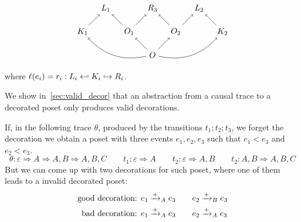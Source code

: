 \begin{definition}
\begin{description}
       \[
    \begin{tikzpicture} %
      \node (o) at (0,-1) {\(O\)};
      \node (r3) at (0,1) {\(R_3\)};
      \node (o1) at (-1,0) {\(O_1\)};
      \node (o2) at (1,0) {\(O_2\)};
      \node (r1) at (-2,1) {\(L_1\)};
      \node (r2) at (2,1) {\(L_2\)};
      \node (k1) at (-3,0) {\(K_1\)};
      \node (k2) at (3,0) {\(K_2\)};
      \draw [->] (o) -- (o1);
      \draw [->] (o) -- (o2);
      \draw [->] (o1) -- (r3);
      \draw [->] (o2) -- (r3);
      \draw [->] (o1) -- (r1);
      \draw [->] (o2) -- (r2);
      \draw [->] (k1) -- (r1);
      \draw [->] (k2) -- (r2);
      \draw [->] (o) to [bend left] (k1);
      \draw [->] (o) to [bend right] (k2);
    \end{tikzpicture}
    \]
  \end{description}
  where $\ell(e_i)=r_i:L_i\hookleftarrow K_i\hookrightarrow R_i$.
\end{definition}


We show in~\autoref{sec:valid_decor} that an abstraction from a causal trace to a decorated poset only produces valid decorations.



\begin{example}
  If, in the following trace $\theta$, produced by the transitions $t_1;t_2;t_3$, we forget the decoration we obtain a poset with three events $e_1,e_2,e_3$ such that $e_1<e_3$ and $e_2<e_3$.
  \[
  \theta:\varepsilon \Rightarrow A \Rightarrow A,B\Rightarrow A,B,C\qquad t_1: \varepsilon \Rightarrow A\qquad t_2: \varepsilon\Rightarrow A,B\qquad t_2: A,B\Rightarrow A,B,C
  \]
  But we can come up with two decorations for such poset, where one of them leads to a invalid decorated poset:
  \begin{align*}
  \text{good decoration: }&e_1\mathrel{\xrightarrow{+}}_A e_3\qquad e_2\mathrel{\xrightarrow{+}}_B e_3\\
  \text{bad decoration: }&e_1\mathrel{\xrightarrow{+}}_A e_3\qquad e_2\mathrel{\xrightarrow{+}}_A e_3
  \end{align*}
\end{example}

